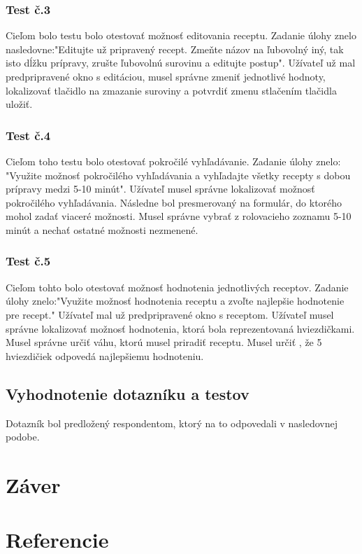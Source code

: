 \documentclass[12pt,a4paper,titlepage,final]{article}
\begin{document}
\subsubsection{Test č.3}
Cieľom bolo testu bolo otestovať možnosť editovania receptu. Zadanie úlohy znelo nasledovne:"Editujte už pripravený recept. Zmeňte názov na ľubovolný iný, tak isto dĺžku prípravy, zrušte ľubovolnú surovinu a editujte postup". Užívateľ už mal predpripravené okno s editáciou, musel správne zmeniť jednotlivé hodnoty, lokalizovať tlačidlo na zmazanie suroviny a potvrdiť zmenu stlačením tlačidla uložiť.

\subsubsection{Test č.4}
Cieľom toho testu bolo otestovať pokročilé vyhľadávanie. Zadanie úlohy znelo: "Využite možnosť pokročilého vyhľadávania a vyhľadajte všetky recepty s dobou prípravy medzi 5-10 minút". Užívateľ musel správne lokalizovať možnosť pokročilého vyhľadávania. Následne bol presmerovaný na formulár, do ktorého mohol zadať viaceré možnosti. Musel správne vybrať z rolovacieho zoznamu 5-10 minút a nechať ostatné možnosti nezmenené.

\subsubsection{Test č.5}
Cieľom tohto bolo otestovať možnosť hodnotenia jednotlivých receptov. Zadanie úlohy znelo:"Využite možnosť hodnotenia receptu a zvoľte najlepšie hodnotenie pre recept." Užívateľ mal už predpripravené okno s receptom. Užívateľ musel správne lokalizovať možnosť hodnotenia, ktorá bola reprezentovaná hviezdičkami. Musel správne určiť váhu, ktorú musel priradiť receptu. Musel určiť , že 5 hviezdičiek odpovedá najlepšiemu hodnoteniu.




\subsection{Vyhodnotenie dotazníku a testov}

Dotazník bol predložený respondentom, ktorý na to odpovedali v nasledovnej podobe. 


\section{Záver}

\newpage

\section{Referencie}





\end{document}
